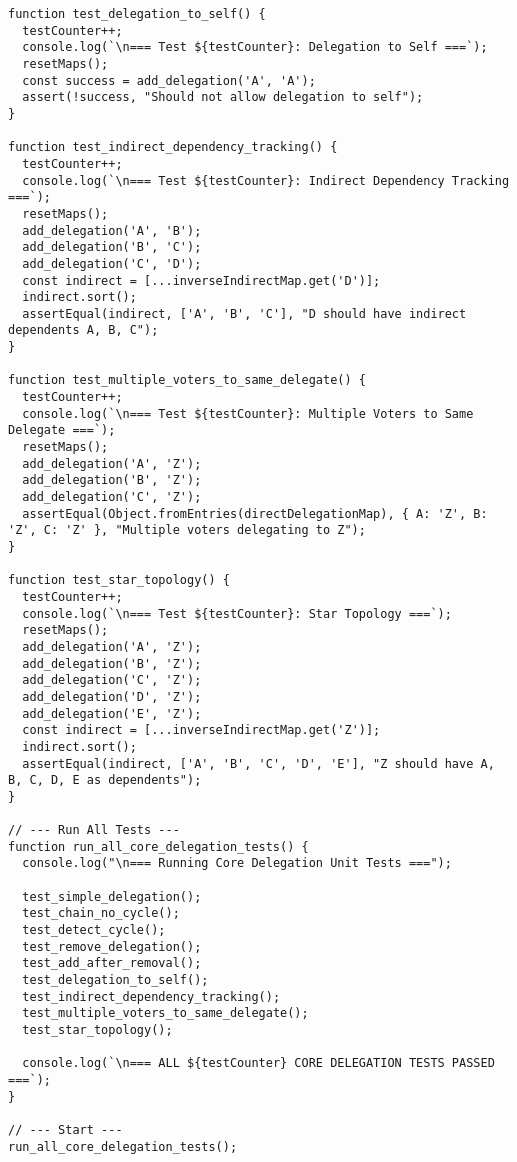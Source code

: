 \begin{verbatim}
function test_delegation_to_self() {
  testCounter++;
  console.log(`\n=== Test ${testCounter}: Delegation to Self ===`);
  resetMaps();
  const success = add_delegation('A', 'A');
  assert(!success, "Should not allow delegation to self");
}

function test_indirect_dependency_tracking() {
  testCounter++;
  console.log(`\n=== Test ${testCounter}: Indirect Dependency Tracking ===`);
  resetMaps();
  add_delegation('A', 'B');
  add_delegation('B', 'C');
  add_delegation('C', 'D');
  const indirect = [...inverseIndirectMap.get('D')];
  indirect.sort();
  assertEqual(indirect, ['A', 'B', 'C'], "D should have indirect dependents A, B, C");
}

function test_multiple_voters_to_same_delegate() {
  testCounter++;
  console.log(`\n=== Test ${testCounter}: Multiple Voters to Same Delegate ===`);
  resetMaps();
  add_delegation('A', 'Z');
  add_delegation('B', 'Z');
  add_delegation('C', 'Z');
  assertEqual(Object.fromEntries(directDelegationMap), { A: 'Z', B: 'Z', C: 'Z' }, "Multiple voters delegating to Z");
}

function test_star_topology() {
  testCounter++;
  console.log(`\n=== Test ${testCounter}: Star Topology ===`);
  resetMaps();
  add_delegation('A', 'Z');
  add_delegation('B', 'Z');
  add_delegation('C', 'Z');
  add_delegation('D', 'Z');
  add_delegation('E', 'Z');
  const indirect = [...inverseIndirectMap.get('Z')];
  indirect.sort();
  assertEqual(indirect, ['A', 'B', 'C', 'D', 'E'], "Z should have A, B, C, D, E as dependents");
}

// --- Run All Tests ---
function run_all_core_delegation_tests() {
  console.log("\n=== Running Core Delegation Unit Tests ===");

  test_simple_delegation();
  test_chain_no_cycle();
  test_detect_cycle();
  test_remove_delegation();
  test_add_after_removal();
  test_delegation_to_self();
  test_indirect_dependency_tracking();
  test_multiple_voters_to_same_delegate();
  test_star_topology();

  console.log(`\n=== ALL ${testCounter} CORE DELEGATION TESTS PASSED ===`);
}

// --- Start ---
run_all_core_delegation_tests();
\end{verbatim}

